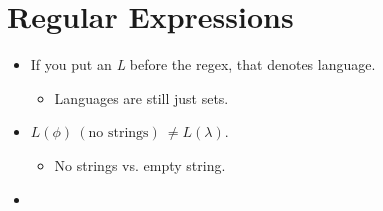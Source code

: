 \documentclass[12pt]{article}
\begin{document}
\section{Regular Expressions}

\begin{itemize}
    \item If you put an \textit{L} before the regex, that denotes language.
    \begin{itemize}
        \item Languages are still just sets.
    \end{itemize}

    \item $L(\phi) \ (\text{no strings}) \ \neq L(\lambda)$.
    \begin{itemize}
        \item No strings vs. empty string.
    \end{itemize}

    \item
\end{itemize}
\end{document}
